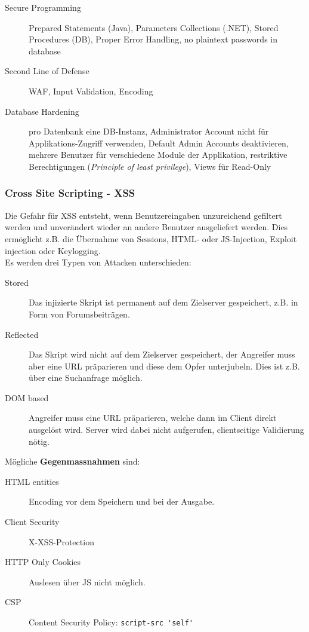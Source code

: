\begin{description}
	\item[Secure Programming] Prepared Statements (Java), Parameters Collections (.NET), Stored Procedures (DB), Proper Error Handling, no plaintext passwords in database
	\item[Second Line of Defense] WAF, Input Validation, Encoding \item[Database Hardening] pro Datenbank eine DB-Instanz, Administrator Account nicht für Applikations-Zugriff verwenden, Default Admin Accounts deaktivieren, mehrere Benutzer für verschiedene Module der Applikation, restriktive Berechtigungen (\textit{Principle of least privilege}), Views für Read-Only
\end{description}

\subsubsection{Cross Site Scripting - XSS}
Die Gefahr für XSS entsteht, wenn Benutzereingaben unzureichend gefiltert werden und unverändert wieder an andere Benutzer ausgeliefert werden. Dies ermöglicht z.B. die Übernahme von Sessions, HTML- oder JS-Injection, Exploit injection oder Keylogging.\\
Es werden drei Typen von Attacken unterschieden:
\begin{description}
	\item[Stored] Das injizierte Skript ist permanent auf dem Zielserver gespeichert, z.B. in Form von Forumsbeiträgen.
	\item[Reflected] Das Skript wird nicht auf dem Zielserver gespeichert, der Angreifer muss aber eine URL präparieren und diese dem Opfer unterjubeln. Dies ist z.B. über eine Suchanfrage möglich.
	\item[DOM based] Angreifer muss eine URL präparieren, welche dann im Client direkt ausgelöst wird. Server wird dabei nicht aufgerufen, clientseitige Validierung nötig.
\end{description}

Mögliche \textbf{Gegenmassnahmen} sind:
\begin{description}
	\item[HTML entities] Encoding vor dem Speichern und bei der Ausgabe.
	\item[Client Security] X-XSS-Protection
	\item[HTTP Only Cookies] Auslesen über JS nicht möglich.
	\item[CSP] Content Security Policy: \lstinline|script-src 'self'|
\end{description}

